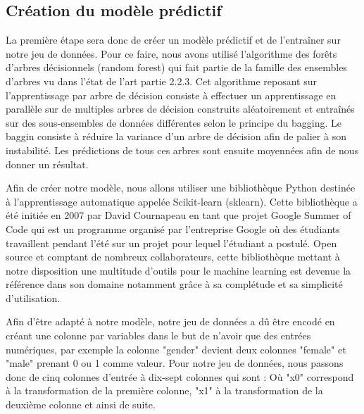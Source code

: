 \subsection{Création du modèle prédictif}
La première étape sera donc de créer un modèle prédictif et de l'entraîner sur notre jeu de données. Pour ce faire, nous avons utilisé l'algorithme des forêts d'arbres décisionnels (random forest) qui fait partie de la famille des ensembles d'arbres vu dans l'état de l'art partie 2.2.3. Cet algorithme reposant sur l'apprentissage par arbre de décision consiste à effectuer un apprentissage en parallèle sur de multiples arbres de décision construits aléatoirement et entraînés sur des sous-ensembles de données différentes selon le principe du bagging. Le baggin consiste à réduire la variance d'un arbre de décision afin de palier à son instabilité. Les prédictions de tous ces arbres sont ensuite moyennées afin de nous donner un résultat.\par
Afin de créer notre modèle, nous allons utiliser une bibliothèque Python destinée à l'apprentissage automatique appelée Scikit-learn (sklearn)\cite{sklearnDepot}. Cette bibliothèque a été initiée en 2007 par David Cournapeau en tant que projet Google Summer of Code qui est un programme organisé par l'entreprise Google où des étudiants travaillent pendant l'été sur un projet pour lequel l'étudiant a postulé. Open source et comptant de nombreux collaborateurs, cette bibliothèque mettant à notre disposition une multitude d'outils pour le machine learning est devenue la référence dans son domaine notamment grâce à sa complétude et sa simplicité d'utilisation.\par
Afin d'être adapté à notre modèle, notre jeu de données a dû être encodé en créant une colonne par variables dans le but de n'avoir que des entrées numériques, par exemple la colonne "gender" devient deux colonnes "female" et "male" prenant 0 ou 1 comme valeur. Pour notre jeu de données, nous passons donc de cinq colonnes d'entrée à dix-sept colonnes qui sont : \medbreak
Où "x0" correspond à la transformation de la première colonne, "x1" à la transformation de la deuxième colonne et ainsi de suite.

